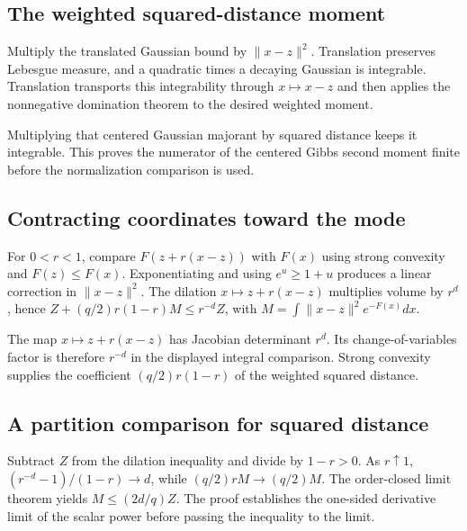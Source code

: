 \documentclass[11pt,a4paper]{article}
\begin{document}
\subsection{\texorpdfstring{The weighted squared-distance moment}{The weighted squared-distance moment}}


Multiply the translated Gaussian bound by \(\|x-z\|^2\). Translation preserves Lebesgue measure, and a quadratic times a decaying Gaussian is integrable. Translation transports this integrability through \(x\mapsto x-z\) and then applies the nonnegative domination theorem to the desired weighted moment.



Multiplying that centered Gaussian majorant by squared distance keeps it integrable. This proves the numerator of the centered Gibbs second moment finite before the normalization comparison is used.


\subsection{\texorpdfstring{Contracting coordinates toward the mode}{Contracting coordinates toward the mode}}


For \(0<r<1\), compare \(F(z+r(x-z))\) with \(F(x)\) using strong convexity and \(F(z)\le F(x)\). Exponentiating and using \(e^u\ge1+u\) produces a linear correction in \(\|x-z\|^2\). The dilation \(x\mapsto z+r(x-z)\) multiplies volume by \(r^d\), hence \(Z+(q/2)r(1-r)M\le r^{-d}Z\), with \(M=\int\|x-z\|^2e^{-F(x)}dx\).



The map \(x\mapsto z+r(x-z)\) has Jacobian determinant \(r^d\). Its change-of-variables factor is therefore \(r^{-d}\) in the displayed integral comparison. Strong convexity supplies the coefficient \((q/2)r(1-r)\) of the weighted squared distance.


\subsection{\texorpdfstring{A partition comparison for squared distance}{A partition comparison for squared distance}}


Subtract \(Z\) from the dilation inequality and divide by \(1-r>0\). As \(r\uparrow1\), \((r^{-d}-1)/(1-r)\to d\), while \((q/2)rM\to(q/2)M\). The order-closed limit theorem yields \(M\le(2d/q)Z\). The proof establishes the one-sided derivative limit of the scalar power before passing the inequality to the limit.
\end{document}
